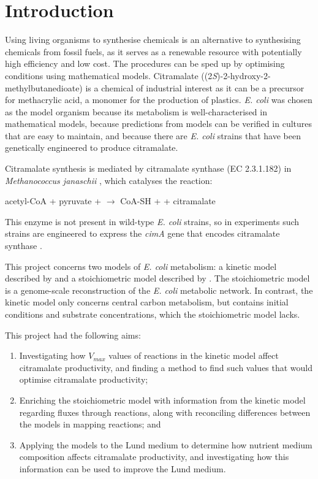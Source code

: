 \documentclass[parskip=full, numbers=noenddot]{scrreprt}
\begin{document}
\chapter*{Introduction}
\label{ch:intro}

Using living organisms to synthesise chemicals is an alternative to synthesising chemicals from fossil fuels, as it serves as a renewable resource with potentially high efficiency and low cost. The procedures can be sped up by optimising conditions using mathematical models. Citramalate ((2\emph{S})-2-hydroxy-2-methylbutanedioate) is a chemical of industrial interest as it can be a precursor for methacrylic acid, a monomer for the production of plastics. \emph{E. coli} was chosen as the model organism because its metabolism is well-characterised in mathematical models, because predictions from models can be verified in cultures that are easy to maintain, and because there are \emph{E. coli} strains that have been genetically engineered to produce citramalate.

Citramalate synthesis is mediated by citramalate synthase (EC 2.3.1.182) in \emph{Methanococcus janaschii} \citep{wu_production_2016}, which catalyses the reaction:

\begin{center}
  acetyl-CoA + pyruvate +  $\rightarrow$ CoA-SH +  + citramalate
\end{center}

This enzyme is not present in wild-type \emph{E. coli} strains, so in experiments such strains are engineered to express the \emph{cimA} gene that encodes citramalate synthase \citep{wu_production_2016}.

This project concerns two models of \emph{E. coli} metabolism: a kinetic model described by \citet{millard_metabolic_2017} and a stoichiometric model described by \citet{orth_comprehensive_2011}.
The stoichiometric model is a genome-scale reconstruction of the \emph{E. coli} metabolic network. In contrast, the kinetic model only concerns central carbon metabolism, but contains initial conditions and substrate concentrations, which the stoichiometric model lacks.

This project had the following aims:

\begin{enumerate}
\item Investigating how $V_{max}$ values of reactions in the kinetic model affect citramalate productivity, and finding a method to find such values that would optimise citramalate productivity;
\item Enriching the stoichiometric model with information from the kinetic model regarding fluxes through reactions, along with reconciling differences between the models in mapping reactions; and
  \item Applying the models to the Lund medium \citep{eastham_process_2015} to determine how nutrient medium composition affects citramalate productivity, and investigating how this information can be used to improve the Lund medium.
\end{enumerate}
\end{document}
